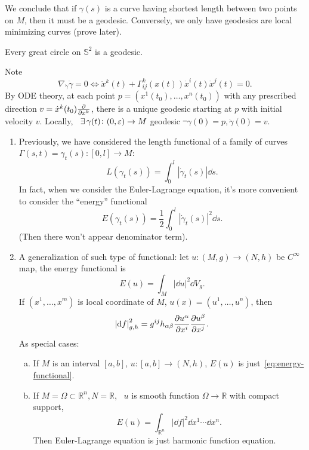 We conclude that if \(\gamma(s)\) is a curve having shortest length between two points
on \(M\), then it must be a geodesic. Conversely, we only have geodesics are local
minimizing curves (prove later).

\begin{example}
    Every great circle on \(\mathbb{S}^2\) is a geodesic.
\end{example}
Note \[
    \nabla_{\dot\gamma}\dot\gamma=0\iff \ddot x^k(t)+\Gamma_{ij}^k(x(t))\dot x^i(t)
    \dot x^j(t)=0.
\] By ODE theory, at each point \(p=(x^1(t_0),\ldots,x^n(t_0))\) with any prescribed
direction \(v=\dot x^k(t_0)\pdv{x^k}\), there is a unique geodesic starting at \(p\)
with initial velocity \(v\). Locally, \ie\ \(\exists\,\gamma(t)\colon (0,\varepsilon)\to M\)
geodesic \st\ \(\gamma(0)=p,\dot\gamma(0)=v\).

\begin{remark}
\begin{enumerate}[(1)]
\item Previously, we have considered the length functional of a family of curves
    \(\Gamma(s,t)=\gamma_t(s)\colon [0,l]\to M\): \[
        L(\gamma_t(s))=\int_{0}^{l}\left|\dot\gamma_t(s)\right|\dd{s}
    .\] In fact, when we consider the Euler-Lagrange equation, it's more convenient
    to consider the ``energy'' functional 
    \begin{equation}\label{eq:energy-functional}
        E(\gamma_t(s))=\frac{1}{2}\int_{0}^{l}\left|\dot\gamma_t(s)\right|^2\dd{s}
    .\end{equation}
    (Then there won't appear denominator term).
\item A generalization of such type of functional: let \(u\colon(M,g)\to (N,h)\)
    be \(C^\infty\) map, the energy functional is \[
        E(u)=\int_{M}\left|\dd{u}\right|^2\dd{V_g}
    .\] If \((x^1,\ldots,x^m)\) is local coordinate of \(M\), \(u(x)=(u^1,\ldots,u^n)
    \), then \[
        \left|\dd{f}\right|_{g,h}^2=g^{ij}h_{\alpha\beta}
        \pdv{u^\alpha}{x^i}\pdv{u^\beta}{x^j}
    .\] As special cases:
    \begin{enumerate}[(a)]
    \item If \(M\) is an interval \([a,b]\), \(u\colon [a,b]\to (N,h)\), \(E(u)\)
        is just~\cref{eq:energy-functional}.
    \item If \(M=\Omega\subset \mathbb{R}^n,N=\mathbb{R}\), \ie\ \(u\) is smooth
        function \(\Omega\to \mathbb{R}\) with compact support, \[
            E(u)=\int_{\mathbb{R}^n}|\dd{f}|^2\dd{x^1}\cdots \dd{x^n}
        .\] Then Euler-Lagrange equation is just harmonic function equation.
    \end{enumerate}
\end{enumerate}
\end{remark}

